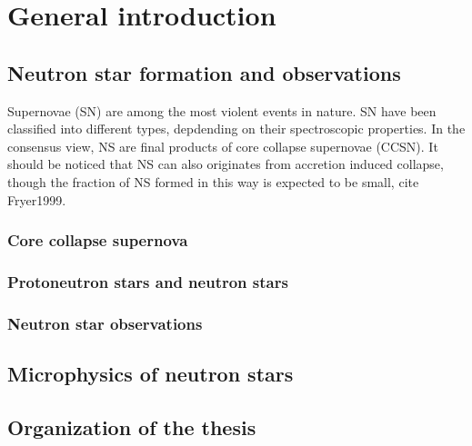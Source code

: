 \chapter*{General introduction}

% 
%

\section*{Neutron star formation and observations}

Supernovae (SN) are among the most violent events in nature. 
%
SN have been classified into different types, depdending on their 
spectroscopic properties. 
%
In the consensus view, NS are final products of core collapse supernovae 
(CCSN).
It should be noticed that NS can also originates from accretion induced 
collapse, though the fraction of NS formed in this way is expected to be 
small, cite Fryer1999.

\subsection*{Core collapse supernova}





\subsection*{Protoneutron stars and neutron stars}



\subsection*{Neutron star observations}

\section*{Microphysics of neutron stars}

\section*{Organization of the thesis}

\clearpage\thispagestyle{empty}

